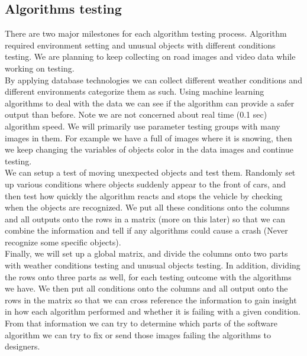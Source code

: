 \subsection{Algorithms testing}
There are two major milestones for each algorithm testing process. 
Algorithm required environment setting and unusual objects with different conditions testing. 
We are planning to keep collecting on road images and video data while working on testing.\\
By applying database technologies we can collect different weather conditions and different environments  categorize them as such. 
Using machine learning algorithms to deal with the data we can see if the algorithm can provide a safer output than before. 
Note we are not concerned about real time (0.1 sec) algorithm speed. 
We will primarily use parameter testing groups with many images in them. 
For example we have a full of images where it is snowing, then we keep changing the variables of objects color in the data images and continue testing.\\
We can setup a test of moving unexpected objects and test them. 
Randomly set up various conditions where objects suddenly appear to the front of cars, and then test how quickly the algorithm reacts and stops the vehicle by checking when the objects are recognized. 
We put all these conditions onto the columns and all outputs onto the rows in a matrix (more on this later) so that we can combine the information and tell if any algorithms could cause a crash (Never recognize some specific objects).\\
Finally, we will set up a global matrix, and divide the columns onto two parts with weather conditions testing and unusual objects testing. 
In addition, dividing the rows onto three parts as well, for each testing outcome with the algorithms we have. 
We then put all conditions onto the columns and all output onto the rows in the matrix so that we can cross reference the information to gain insight in how each algorithm performed and whether it is failing with a given condition.
From that information we can try to determine which parts of the software algorithm we can try to fix or send those images failing the algorithms to designers.

